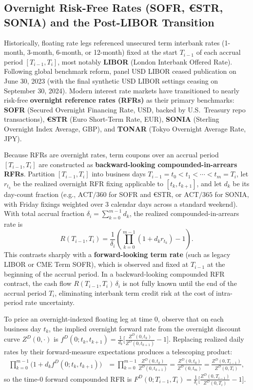 \subsection*{Overnight Risk-Free Rates (SOFR, €STR, SONIA) and the Post-LIBOR Transition}
Historically, floating rate legs referenced unsecured term interbank rates (1-month, 3-month, 6-month, or 12-month) fixed at the start $T_{i-1}$ of each accrual period $[T_{i-1}, T_i]$, most notably \textbf{LIBOR} (London Interbank Offered Rate). Following global benchmark reform, panel USD LIBOR ceased publication on June 30, 2023 (with the final synthetic USD LIBOR settings ceasing on September 30, 2024). Modern interest rate markets have transitioned to nearly risk-free \textbf{overnight reference rates (RFRs)} as their primary benchmarks: \textbf{SOFR} (Secured Overnight Financing Rate, USD, backed by U.S.\ Treasury repo transactions), \textbf{€STR} (Euro Short-Term Rate, EUR), \textbf{SONIA} (Sterling Overnight Index Average, GBP), and \textbf{TONAR} (Tokyo Overnight Average Rate, JPY).

Because RFRs are overnight rates, term coupons over an accrual period $[T_{i-1}, T_i]$ are constructed as \textbf{backward-looking compounded-in-arrears RFRs}. Partition $[T_{i-1}, T_i]$ into business days $T_{i-1} = t_0 < t_1 < \cdots < t_m = T_i$, let $r_{t_k}$ be the realized overnight RFR fixing applicable to $[t_k, t_{k+1}]$, and let $d_k$ be its day-count fraction (e.g., $\text{ACT}/360$ for SOFR and €STR, or $\text{ACT}/365$ for SONIA, with Friday fixings weighted over $3$ calendar days across a standard weekend). With total accrual fraction $\delta_i = \sum_{k=0}^{m-1} d_k$, the realized compounded-in-arrears rate is
\begin{equation}\label{eq:compounded-rfr}
R(T_{i-1}, T_i) = \frac{1}{\delta_i}\left(\prod_{k=0}^{m-1} (1 + d_k r_{t_k}) - 1\right).
\end{equation}
This contrasts sharply with a \textbf{forward-looking term rate} (such as legacy LIBOR or CME Term SOFR), which is observed and fixed at $T_{i-1}$ at the beginning of the accrual period. In a backward-looking compounded RFR contract, the cash flow $R(T_{i-1}, T_i)\,\delta_i$ is not fully known until the end of the accrual period $T_i$, eliminating interbank term credit risk at the cost of intra-period rate uncertainty.

To price an overnight-indexed floating leg at time $0$, observe that on each business day $t_k$, the implied overnight forward rate from the overnight discount curve $Z^D(0, \cdot)$ is $f^D(0; t_k, t_{k+1}) = \frac{1}{d_k}\bigl[\frac{Z^D(0, t_k)}{Z^D(0, t_{k+1})} - 1\bigr]$. Replacing realized daily rates by their forward-measure expectations produces a telescoping product:
\begin{align*}
\prod_{k=0}^{m-1} \bigl(1 + d_k f^D(0; t_k, t_{k+1})\bigr)
&= \prod_{k=0}^{m-1} \frac{Z^D(0, t_k)}{Z^D(0, t_{k+1})}
= \frac{Z^D(0, t_0)}{Z^D(0, t_m)} = \frac{Z^D(0, T_{i-1})}{Z^D(0, T_i)},
\end{align*}
so the time-$0$ forward compounded RFR is $F^D(0; T_{i-1}, T_i) = \frac{1}{\delta_i}\bigl[\frac{Z^D(0, T_{i-1})}{Z^D(0, T_i)} - 1\bigr]$.

